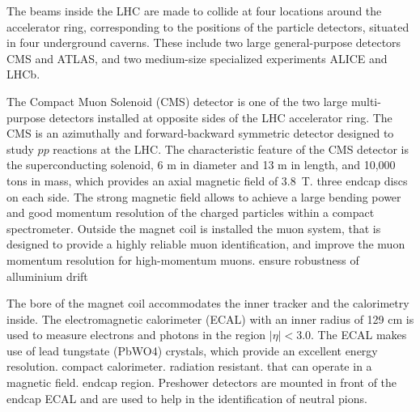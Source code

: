 The beams inside the LHC are made to collide at four locations around the 
accelerator ring, corresponding 
to the positions of the particle detectors, situated in four underground 
caverns. These include two large 
general-purpose detectors CMS and ATLAS, and two medium-size specialized 
experiments ALICE and LHCb.

The Compact Muon Solenoid (CMS) detector is one of the two large 
multi-purpose detectors 
installed at opposite sides of the LHC accelerator ring. 
The CMS is an azimuthally and forward-backward symmetric 
detector designed to study $pp$ reactions at the LHC.
The characteristic feature of the CMS detector is the superconducting
solenoid, 6 m in diameter and 13 m in length, and 10,000 tons in mass, 
which provides an axial magnetic field of 3.8~T. 
three endcap discs on each side. 
The strong magnetic field allows to achieve a large bending power and good 
momentum resolution of the charged particles within a compact 
spectrometer. 
Outside the magnet coil %
is installed the muon system, that 
is designed to provide a highly reliable muon identification, and
improve the muon momentum resolution for high-momentum muons. 
ensure robustness
of alluminium drift

The bore of the magnet coil accommodates the inner tracker and the
calorimetry inside. 
The electromagnetic calorimeter (ECAL) with an inner radius of 129 cm
is used to measure electrons and photons in the region $|\eta| < 3.0$.
The ECAL makes use of lead tungstate (PbWO4) crystals, which 
provide an excellent energy resolution. 
compact calorimeter.
radiation resistant. 
that can operate in a magnetic field.
endcap region. 
Preshower detectors are mounted in front of the endcap ECAL and are used 
to help in the identification 
of neutral pions.

